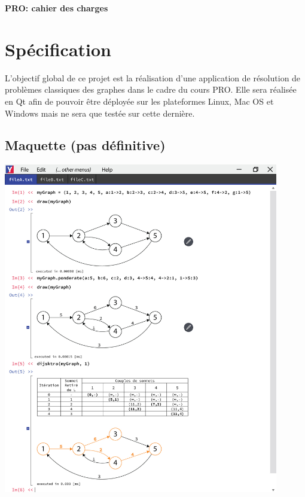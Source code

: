 \documentclass[french]{article}
\begin{document}
	\centering
	\large{\textbf{PRO: cahier des charges}}
	
	\justify
	
	\section{Spécification}
		L'objectif global de ce projet est la réalisation d'une application de résolution de problèmes classiques des graphes dans le cadre du cours PRO. Elle sera réalisée en Qt afin de pouvoir être déployée sur les plateformes Linux, Mac OS et Windows mais ne sera que testée sur cette dernière.
		
		\subsection{Maquette (pas définitive)}
			\includegraphics[width=0.9\textwidth]{maquette}
		
\end{document}
